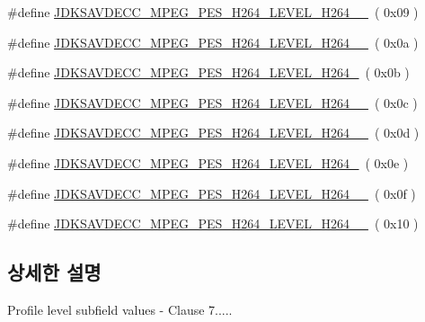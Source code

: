 \begin{DoxyCompactItemize}
\#define \hyperlink{group__mpeg__pes__h264__level_ga575056174fb4084d957d29cac4a06f50}{J\+D\+K\+S\+A\+V\+D\+E\+C\+C\+\_\+\+M\+P\+E\+G\+\_\+\+P\+E\+S\+\_\+\+H264\+\_\+\+L\+E\+V\+E\+L\+\_\+\+H264\+\_\+\_}~( 0x09 )
\item 
\#define \hyperlink{group__mpeg__pes__h264__level_gaa8db03dda6faa0c9ca0b42badd04e38e}{J\+D\+K\+S\+A\+V\+D\+E\+C\+C\+\_\+\+M\+P\+E\+G\+\_\+\+P\+E\+S\+\_\+\+H264\+\_\+\+L\+E\+V\+E\+L\+\_\+\+H264\+\_\+\_}~( 0x0a )
\item 
\#define \hyperlink{group__mpeg__pes__h264__level_gad7a1ccc4b7f7cdb28a2dc23d697ce942}{J\+D\+K\+S\+A\+V\+D\+E\+C\+C\+\_\+\+M\+P\+E\+G\+\_\+\+P\+E\+S\+\_\+\+H264\+\_\+\+L\+E\+V\+E\+L\+\_\+\+H264\+\_}~( 0x0b )
\item 
\#define \hyperlink{group__mpeg__pes__h264__level_gacadb77d4e383446d94d1f36d7e3db7c0}{J\+D\+K\+S\+A\+V\+D\+E\+C\+C\+\_\+\+M\+P\+E\+G\+\_\+\+P\+E\+S\+\_\+\+H264\+\_\+\+L\+E\+V\+E\+L\+\_\+\+H264\+\_\+\_}~( 0x0c )
\item 
\#define \hyperlink{group__mpeg__pes__h264__level_ga7fac087eb0be56817561bb0e52f9e00c}{J\+D\+K\+S\+A\+V\+D\+E\+C\+C\+\_\+\+M\+P\+E\+G\+\_\+\+P\+E\+S\+\_\+\+H264\+\_\+\+L\+E\+V\+E\+L\+\_\+\+H264\+\_\+\_}~( 0x0d )
\item 
\#define \hyperlink{group__mpeg__pes__h264__level_ga97a320f72708b64a1b57a33fd928a948}{J\+D\+K\+S\+A\+V\+D\+E\+C\+C\+\_\+\+M\+P\+E\+G\+\_\+\+P\+E\+S\+\_\+\+H264\+\_\+\+L\+E\+V\+E\+L\+\_\+\+H264\+\_}~( 0x0e )
\item 
\#define \hyperlink{group__mpeg__pes__h264__level_ga23d0dc4ff0ddabf3eb1e4b6c17ed21df}{J\+D\+K\+S\+A\+V\+D\+E\+C\+C\+\_\+\+M\+P\+E\+G\+\_\+\+P\+E\+S\+\_\+\+H264\+\_\+\+L\+E\+V\+E\+L\+\_\+\+H264\+\_\+\_}~( 0x0f )
\item 
\#define \hyperlink{group__mpeg__pes__h264__level_ga39a69417a79395f02f888db07b2eb9cd}{J\+D\+K\+S\+A\+V\+D\+E\+C\+C\+\_\+\+M\+P\+E\+G\+\_\+\+P\+E\+S\+\_\+\+H264\+\_\+\+L\+E\+V\+E\+L\+\_\+\+H264\+\_\+\_}~( 0x10 )
\end{DoxyCompactItemize}


\subsection{상세한 설명}
Profile level subfield values -\/ Clause 7..... 

